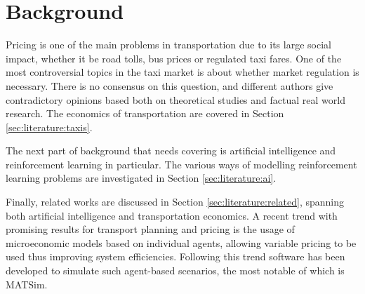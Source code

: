 \newpage
\section{Background}
\label{sec:literature}

Pricing is one of the main problems in transportation due to its large social
impact, whether it be road tolls, bus prices or regulated taxi fares. One of
the most controversial topics in the taxi market is about whether market
regulation is necessary. There is no consensus on this question, and different
authors give contradictory opinions based both on theoretical studies and
factual real world research. The economics of transportation are covered in
Section \ref{sec:literature:taxis}.

The next part of background that needs covering is artificial intelligence and
reinforcement learning in particular. The various ways of modelling
reinforcement learning problems are investigated in Section
\ref{sec:literature:ai}.

Finally, related works are discussed in Section \ref{sec:literature:related},
spanning both artificial intelligence and transportation economics. A recent
trend with promising results for transport planning and pricing is the usage of
microeconomic models based on individual agents, allowing variable pricing to
be used thus improving system efficiencies. Following this trend software has
been developed to simulate such agent-based scenarios, the most notable of
which is MATSim.
